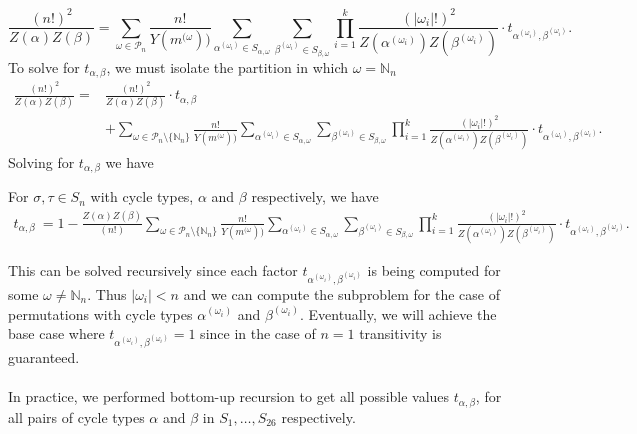 \[
    \frac{(n!)^2}{Z(\alpha)Z(\beta)} = \sum_{\omega\in\mathcal{P}_n}\frac{n!}{Y(m^{(\omega}))}\sum_{\alpha^{(\omega_i)}\in S_{\alpha,\omega}}\sum_{\beta^{(\omega_i)}\in S_{\beta,\omega}}\prod_{i=1}^k
{\frac{(|\omega_i|!)^2}{Z(\alpha^{(\omega_i)})Z(\beta^{(\omega_i)})}}\cdot t_{\alpha^{(\omega_i)},\beta^{(\omega_i)}}.
\]
To solve for $t_{\alpha,\beta}$, we must isolate the partition in which $\omega=\mathbb{N}_n$
\begin{align*}
    \frac{(n!)^2}{Z(\alpha)Z(\beta)} = &\frac{(n!)^2}{Z(\alpha)Z(\beta)}\cdot t_{\alpha, \beta}\\
    &+ \sum_{\omega\in\mathcal{P}_n \setminus \{\mathbb{N}_n\}}\frac{n!}{Y(m^{(\omega}))}\sum_{\alpha^{(\omega_i)}\in S_{\alpha,\omega}}\sum_{\beta^{(\omega_i)}\in S_{\beta,\omega}}\prod_{i=1}^k
{\frac{(|\omega_i|!)^2}{Z(\alpha^{(\omega_i)})Z(\beta^{(\omega_i)})}}\cdot t_{\alpha^{(\omega_i)},\beta^{(\omega_i)}}.
\end{align*}
Solving for $t_{\alpha,\beta}$ we have
\begin{theorem}
For $\sigma,\tau\in S_n$ with cycle types, $\alpha$ and $\beta$ respectively, we have 
\begin{align*}
    t_{\alpha, \beta}\ = 1 - \frac{Z(\alpha)Z(\beta)}{(n!)}\sum_{\omega\in\mathcal{P}_n \setminus\{\mathbb{N}_n\}}\frac{n!}{Y(m^{(\omega}))}\sum_{\alpha^{(\omega_i)}\in S_{\alpha,\omega}}\sum_{\beta^{(\omega_i)}\in S_{\beta,\omega}}\prod_{i=1}^k
{\frac{(|\omega_i|!)^2}{Z(\alpha^{(\omega_i)})Z(\beta^{(\omega_i)})}}\cdot t_{\alpha^{(\omega_i)},\beta^{(\omega_i)}}.
\end{align*}
\end{theorem}
\noindent This can be solved recursively since each factor $t_{\alpha^{(\omega_i)},\beta^{(\omega_i)}}$ is being computed for some $\omega \ne \mathbb{N}_n$. Thus $|\omega_i| < n$ and we can compute the subproblem for the case of permutations with cycle types $\alpha^{(\omega_i)}$ and $\beta^{(\omega_i)}$. Eventually, we will achieve the base case where $t_{\alpha^{(\omega_i)},\beta^{(\omega_i)}} = 1$ since in the case of $n =1$ transitivity is guaranteed. 
\\\\In practice, we performed bottom-up recursion to get all possible values $t_{\alpha,\beta}$, for all pairs of cycle types $\alpha$ and $\beta$ in $S_1, \dots, S_{26}$ respectively.

